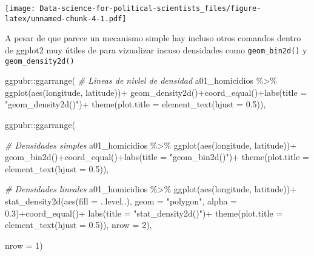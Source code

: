 \documentclass[
]{book}
\newenvironment{Shaded}{\begin{snugshade}}{\end{snugshade}}
\newcommand{\AttributeTok}[1]{\textcolor[rgb]{0.77,0.63,0.00}{#1}}
\newcommand{\CommentTok}[1]{\textcolor[rgb]{0.56,0.35,0.01}{\textit{#1}}}
\newcommand{\DecValTok}[1]{\textcolor[rgb]{0.00,0.00,0.81}{#1}}
\newcommand{\FloatTok}[1]{\textcolor[rgb]{0.00,0.00,0.81}{#1}}
\newcommand{\FunctionTok}[1]{\textcolor[rgb]{0.00,0.00,0.00}{#1}}
\newcommand{\NormalTok}[1]{#1}
\newcommand{\SpecialCharTok}[1]{\textcolor[rgb]{0.00,0.00,0.00}{#1}}
\newcommand{\StringTok}[1]{\textcolor[rgb]{0.31,0.60,0.02}{#1}}
\begin{document}
\texttt{[image: Data-science-for-political-scientists\_files/figure-latex/unnamed-chunk-4-1.pdf]}

A pesar de que parece un mecanismo simple hay incluso otros comandos dentro de ggplot2 muy útiles de para vizualizar incuso densidades como \texttt{geom\_bin2d()} y \texttt{geom\_density2d()}

\begin{Shaded}
\begin{Highlighting}[]
\NormalTok{ggpubr}\SpecialCharTok{::}\FunctionTok{ggarrange}\NormalTok{(}
  \CommentTok{\# Lineas de nivlel de densidad}
\NormalTok{   a01\_homicidios }\SpecialCharTok{\%\textgreater{}\%} \FunctionTok{ggplot}\NormalTok{(}\FunctionTok{aes}\NormalTok{(longitude, latitude))}\SpecialCharTok{+}
    \FunctionTok{geom\_density2d}\NormalTok{()}\SpecialCharTok{+}\FunctionTok{coord\_equal}\NormalTok{()}\SpecialCharTok{+}\FunctionTok{labs}\NormalTok{(}\AttributeTok{title =} \StringTok{"\textquotesingle{}geom\_density2d()\textquotesingle{}"}\NormalTok{)}\SpecialCharTok{+}
    \FunctionTok{theme}\NormalTok{(}\AttributeTok{plot.title =} \FunctionTok{element\_text}\NormalTok{(}\AttributeTok{hjust =} \FloatTok{0.5}\NormalTok{)),}
   
\NormalTok{   ggpubr}\SpecialCharTok{::}\FunctionTok{ggarrange}\NormalTok{(}
   
  \CommentTok{\# Densidades simples}
\NormalTok{  a01\_homicidios }\SpecialCharTok{\%\textgreater{}\%} \FunctionTok{ggplot}\NormalTok{(}\FunctionTok{aes}\NormalTok{(longitude, latitude))}\SpecialCharTok{+}
    \FunctionTok{geom\_bin2d}\NormalTok{()}\SpecialCharTok{+}\FunctionTok{coord\_equal}\NormalTok{()}\SpecialCharTok{+}\FunctionTok{labs}\NormalTok{(}\AttributeTok{title =} \StringTok{"\textquotesingle{}geom\_bin2d()\textquotesingle{}"}\NormalTok{)}\SpecialCharTok{+}
    \FunctionTok{theme}\NormalTok{(}\AttributeTok{plot.title =} \FunctionTok{element\_text}\NormalTok{(}\AttributeTok{hjust =} \FloatTok{0.5}\NormalTok{)), }
  
  \CommentTok{\# Densidades lineales}
\NormalTok{  a01\_homicidios }\SpecialCharTok{\%\textgreater{}\%} \FunctionTok{ggplot}\NormalTok{(}\FunctionTok{aes}\NormalTok{(longitude, latitude))}\SpecialCharTok{+}
    \FunctionTok{stat\_density2d}\NormalTok{(}\FunctionTok{aes}\NormalTok{(}\AttributeTok{fill =}\NormalTok{ ..level..),}
                   \AttributeTok{geom =} \StringTok{"polygon"}\NormalTok{, }\AttributeTok{alpha =} \FloatTok{0.3}\NormalTok{)}\SpecialCharTok{+}\FunctionTok{coord\_equal}\NormalTok{()}\SpecialCharTok{+}
    \FunctionTok{labs}\NormalTok{(}\AttributeTok{title =} \StringTok{"\textquotesingle{}stat\_density2d()\textquotesingle{}"}\NormalTok{)}\SpecialCharTok{+}
    \FunctionTok{theme}\NormalTok{(}\AttributeTok{plot.title =} \FunctionTok{element\_text}\NormalTok{(}\AttributeTok{hjust =} \FloatTok{0.5}\NormalTok{)),}
  \AttributeTok{nrow =} \DecValTok{2}\NormalTok{),}
  
  \AttributeTok{nrow =} \DecValTok{1}\NormalTok{)}
\end{Highlighting}
\end{Shaded}
\end{document}
